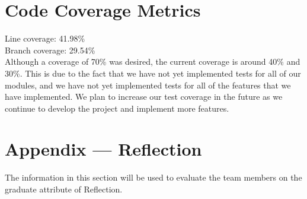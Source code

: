 \documentclass[12pt, titlepage]{article}
\begin{document}
\section{Code Coverage Metrics}

Line coverage: 41.98\% \\
Branch coverage: 29.54\% \\

Although a coverage of 70\% was desired, the current coverage is around 40\% 
and 30\%. This is due to the fact that we have not yet implemented tests for 
all of our modules, and we have not yet implemented tests for all of the features 
that we have implemented. We plan to increase our test coverage in the future 
as we continue to develop the project and implement more features.




\newpage{}
\section*{Appendix --- Reflection}

The information in this section will be used to evaluate the team members on the
graduate attribute of Reflection.


\end{document}

